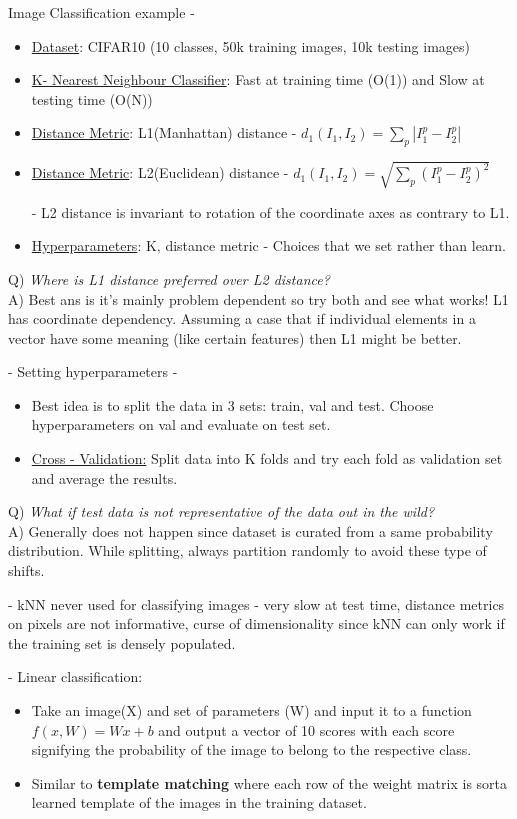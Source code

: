 \documentclass[twoside]{article}
\begin{document}
Image Classification example - 
\begin{itemize}
\item \underline{Dataset}: CIFAR10 (10 classes, 50k training images, 10k testing images)
\item \underline{K- Nearest Neighbour Classifier}: Fast at training time (O(1)) and Slow at testing time (O(N))
\item \underline{Distance Metric}: L1(Manhattan) distance - $d_1(I_1,I_2) = \displaystyle \sum_p |I^p_1 - I^p_2|$
\item \underline{Distance Metric}: L2(Euclidean) distance - $d_1(I_1,I_2) = \displaystyle \sqrt{\sum_p (I^p_1 - I^p_2)^2}
$

- L2 distance is invariant to rotation of the coordinate axes as contrary to L1.

\item \underline{Hyperparameters}: K, distance metric
- Choices that we set rather than learn.
\end{itemize}

Q) \textit{Where is L1 distance preferred over L2 distance?} \\
A) Best ans is it's mainly problem dependent so try both and see what works! L1 has coordinate dependency. Assuming a case that if individual elements in a vector have some meaning (like certain features) then L1 might be better. 

- Setting hyperparameters - 
\begin{itemize}
    \item Best idea is to split the data in 3 sets: train, val and test. Choose hyperparameters on val and evaluate on test set.
    \item \underline {Cross - Validation:} Split data into K folds and try each fold as validation set and average the results.
\end{itemize}

Q) \textit{What if test data is not representative of the data out in the wild?}\\
A) Generally does not happen since dataset is curated from a same probability distribution. While splitting, always partition randomly to avoid these type of shifts.

- kNN never used for classifying images - very slow at test time, distance metrics on pixels are not informative, curse of dimensionality since kNN can only work if the training set is densely populated. 

- Linear classification:
\begin{itemize}
\item Take an image(X) and set of parameters (W) and input it to a function $f(x, W) = Wx + b$  and output a vector of 10 scores with each score signifying the probability of the image to belong to the respective class.

\item Similar to \textbf{template matching} where each row of the weight matrix is sorta learned template of the images in the training dataset.
\end{itemize}
\end{document}
